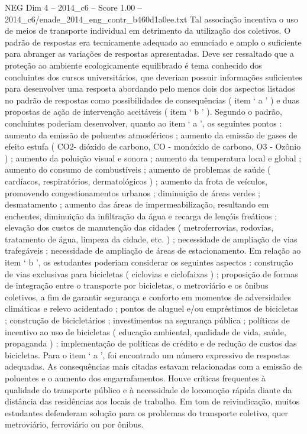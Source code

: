 \begin{textsample}{NEG Dim 4 – 2014\_c6 – Score 1.00 – 2014\_c6/enade\_2014\_eng\_contr\_b460d1a0ee.txt}
Tal associação incentiva o uso de meios de transporte individual em detrimento da utilização dos coletivos.
O padrão de respostas era tecnicamente adequado ao enunciado e amplo o suficiente para abranger as variações de respostas apresentadas.
Deve ser ressaltado que a proteção ao ambiente ecologicamente equilibrado é tema conhecido dos concluintes dos cursos universitários, que deveriam possuir informações suficientes para desenvolver uma resposta abordando pelo menos dois dos aspectos listados no padrão de respostas como possibilidades de consequências ( item ‘ a ’ ) e duas propostas de ação de intervenção aceitáveis ( item ‘ b ’ ).
Segundo o padrão, concluintes poderiam desenvolver, quanto ao item ‘ a ’, os seguintes pontos : aumento da emissão de poluentes atmosféricos ; aumento da emissão de gases de efeito estufa ( CO2- dióxido de carbono, CO - monóxido de carbono, O3 - Ozônio ) ; aumento da poluição visual e sonora ; aumento da temperatura local e global ; aumento do consumo de combustíveis ; aumento de problemas de saúde ( cardíacos, respiratórios, dermatológicos ) ; aumento da frota de veículos, promovendo congestionamentos urbanos ; diminuição de áreas verdes ; desmatamento ; aumento das áreas de impermeabilização, resultando em enchentes, diminuição da infiltração da água e recarga de lençóis freáticos ; elevação dos custos de manutenção das cidades ( metroferrovias, rodovias, tratamento de água, limpeza da cidade, etc. ) ; necessidade de ampliação de vias trafegáveis ; necessidade de ampliação de áreas de estacionamento.
Em relação ao item ‘ b ’, os estudantes poderiam considerar os seguintes aspectos : construção de vias exclusivas para bicicletas ( ciclovias e ciclofaixas ) ; proposição de formas de integração entre o transporte por bicicletas, o metroviário e os ônibus coletivos, a fim de garantir segurança e conforto em momentos de adversidades climáticas e relevo acidentado ; pontos de aluguel e/ou empréstimos de bicicletas ; construção de bicicletários ; investimentos na segurança pública ; políticas de incentivo ao uso de bicicletas ( educação ambiental, qualidade de vida, saúde, propaganda ) ; implementação de políticas de crédito e de redução de custos das bicicletas.
Para o item ‘ a ’, foi encontrado um número expressivo de respostas adequadas.
As consequências mais citadas estavam relacionadas com a emissão de poluentes e o aumento dos engarrafamentos.
Houve críticas frequentes à qualidade do transporte público e à necessidade de locomoção rápida diante da distância das residências aos locais de trabalho.
Em tom de reivindicação, muitos estudantes defenderam solução para os problemas do transporte coletivo, quer metroviário, ferroviário ou por ônibus.

\end{textsample}
